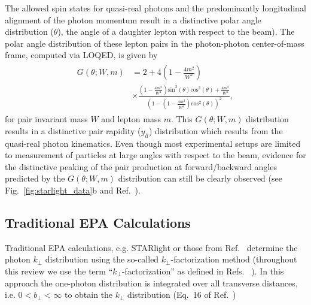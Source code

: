 \documentclass[12pt,epjc3]{svjour3}\sloppy
\begin{document}
The allowed spin states for quasi-real photons and the predominantly longitudinal alignment of the photon momentum result in a distinctive polar angle distribution ($\theta$), the angle of a daughter lepton with respect to the beam). The polar angle distribution of these lepton pairs in the photon-photon center-of-mass frame, computed via LOQED, is given by~\cite{brodskyTwoPhotonMechanismParticle1971a}
\begin{align}
    \begin{split}
  G(\theta; W, m) & = 2 + 4(1-\frac{4m^{2}}{W^{2}})  \\
  & \times \frac{(1-\frac{4m^{2}}{W^{2}})\text{sin}^{2}(\theta)\text{cos}^{2}(\theta)+\frac{4m^{2}}{W^{2}}}{(1-(1-\frac{4m^{2}}{W^{2}})\text{cos}^{2}(\theta))^{2}},
  \label{eq:Gtheta}
  \end{split}
\end{align}
for pair invariant mass $W$ and lepton mass $m$. This $G(\theta; W, m)$ distribution results in a distinctive pair rapidity ($y_{ll}$) distribution which results from the quasi-real photon kinematics. Even though most experimental setups are limited to measurement of particles at large angles with respect to the beam, evidence for the distinctive peaking of the pair production at forward/backward angles predicted by the $G(\theta; W, m)$ distribution can still be clearly observed (see Fig.~\ref{fig:starlight_data}b and Ref.~\cite{starcollaborationMeasurementMomentumAngular2021}).

\subsection{Traditional EPA Calculations}
Traditional EPA calculations, e.g. STARlight or those from Ref.~\cite{klusek-gawendaDileptonRadiationHeavyIon2019} determine the photon $k_\perp$ distribution using the so-called $k_\perp$-factorization method (throughout this review we use the term ``$k_\perp$-factorization'' as defined in Refs. ~\cite{klusek-gawendaDileptonRadiationHeavyIon2019,klusek-gawendaCentralityDependenceDilepton2021}). In this approach the one-photon distribution is integrated over all transverse distances, i.e. $0 < b_\perp < \infty$ to obtain the $k_\perp$ distribution (Eq.~16 of Ref.~\cite{kleinSTARlightMonteCarlo2017b})
\end{document}
